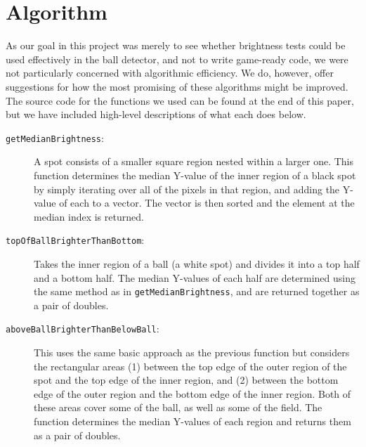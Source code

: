 \documentclass[11pt, twocolumn]{article}
\begin{document}
{\section{Algorithm}
As our goal in this project was merely to see whether brightness tests could be used effectively in the ball detector, and not to write game-ready code, we were not particularly concerned with algorithmic efficiency. We do, however, offer suggestions for how the most promising of these algorithms might be improved. The source code for the functions we used can be found at the end of this paper, but we have included high-level descriptions of what each does below.
\begin{description}
\item[\texttt{getMedianBrightness}:] A spot consists of a smaller square region nested within a larger one. This function determines the median Y-value of the inner region of a black spot by simply iterating over all of the pixels in that region, and adding the Y-value of each to a vector. The vector is then sorted and the element at the median index is returned.
\item[\texttt{topOfBallBrighterThanBottom}:] Takes the inner region of a ball (a white spot) and divides it into a top half and a bottom half. The median Y-values of each half are determined using the same method as in \texttt{getMedianBrightness}, and are returned together as a pair of doubles.
\item[\texttt{aboveBallBrighterThanBelowBall}:] This uses the same basic approach as the previous function but considers the rectangular areas (1) between the top edge of the outer region of the spot and the top edge of the inner region, and (2) between the bottom edge of the outer region and the bottom edge of the inner region. Both of these areas cover some of the ball, as well as some of the field. The function determines the median Y-values of each region and returns them as a pair of doubles. 
\end{description}

}
\end{document}
